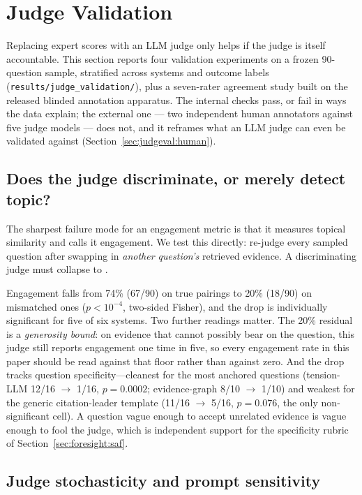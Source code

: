 \section{Judge Validation}
\label{sec:judgeval}

Replacing expert scores with an LLM judge only helps if the judge is
itself accountable. This section reports four validation experiments on
a frozen 90-question sample, stratified across systems and outcome
labels (\texttt{results/judge\_validation/}), plus a seven-rater
agreement study built on the released blinded annotation apparatus.
The internal checks pass, or fail in ways the data explain; the
external one --- two independent human annotators against five judge
models --- does not, and it reframes what an LLM judge can even be
validated against (Section~\ref{sec:judgeval:human}).

\subsection{Does the judge discriminate, or merely detect topic?}
\label{sec:judgeval:mismatch}

The sharpest failure mode for an engagement metric is that it measures
topical similarity and calls it engagement. We test this directly:
re-judge every sampled question after swapping in \emph{another
question's} retrieved evidence. A discriminating judge must collapse to
.

Engagement falls from 74\% (67/90) on true pairings to 20\% (18/90) on
mismatched ones ($p<10^{-4}$, two-sided Fisher), and the drop is
individually significant for five of six systems. Two further readings
matter. The 20\% residual is a \emph{generosity bound}: on evidence
that cannot possibly bear on the question, this judge still reports
engagement one time in five, so every engagement rate in this paper
should be read against that floor rather than against zero. And the
drop tracks question specificity---cleanest for the most anchored
questions (tension-LLM 12/16 $\to$ 1/16, $p=0.0002$; evidence-graph
8/10 $\to$ 1/10) and weakest for the generic citation-leader template
(11/16 $\to$ 5/16, $p=0.076$, the only non-significant cell). A
question vague enough to accept unrelated evidence is vague enough to
fool the judge, which is independent support for the specificity rubric
of Section~\ref{sec:foresight:saf}.

\subsection{Judge stochasticity and prompt sensitivity}

